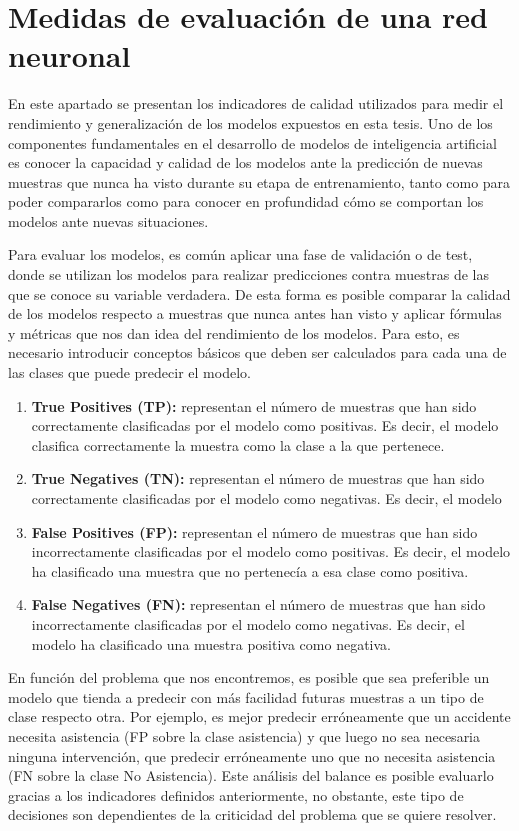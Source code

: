 \documentclass{uathesis-es}
\begin{document}
\section{Medidas de evaluación de una red neuronal}

En este apartado se presentan los indicadores de calidad utilizados para medir el rendimiento y generalización de los modelos expuestos en esta tesis. Uno de los componentes fundamentales en el desarrollo de modelos de inteligencia artificial es conocer la capacidad y calidad de los modelos ante la predicción de nuevas muestras que nunca ha visto durante su etapa de entrenamiento, tanto como para poder compararlos como para conocer en profundidad cómo se comportan los modelos ante nuevas situaciones.

Para evaluar los modelos, es común aplicar una fase de validación o de test, donde se utilizan los modelos para realizar predicciones contra muestras de las que se conoce su variable verdadera. De esta forma es posible comparar la calidad de los modelos respecto a muestras que nunca antes han visto y aplicar fórmulas y métricas que nos dan idea del rendimiento de los modelos. Para esto, es necesario introducir conceptos básicos que deben ser calculados para cada una de las clases que puede predecir el modelo.

\begin{enumerate}
    \item \textbf{True Positives (TP):} representan el número de muestras que han sido correctamente clasificadas por el modelo como positivas. Es decir, el modelo clasifica correctamente la muestra como la clase a la que pertenece.
    \item \textbf{True Negatives (TN):} representan el número de muestras que han sido correctamente clasificadas por el modelo como negativas. Es decir, el modelo
    \item \textbf{False Positives (FP):} representan el número de muestras que han sido incorrectamente clasificadas por el modelo como positivas. Es decir, el modelo ha clasificado una muestra que no pertenecía a esa clase como positiva.
    \item \textbf{False Negatives (FN):} representan el número de muestras que han sido incorrectamente clasificadas por el modelo como negativas. Es decir, el modelo ha clasificado una muestra positiva como negativa.
\end{enumerate}

En función del problema que nos encontremos, es posible que sea preferible un modelo que tienda a predecir con más facilidad futuras muestras a un tipo de clase respecto otra. Por ejemplo, es mejor predecir erróneamente que un accidente necesita asistencia (FP sobre la clase asistencia) y que luego no sea necesaria ninguna intervención, que predecir erróneamente uno que no necesita asistencia (FN sobre la clase No Asistencia). Este análisis del balance es posible evaluarlo gracias a los indicadores definidos anteriormente, no obstante, este tipo de decisiones son dependientes de la criticidad del problema que se quiere resolver.
\end{document}
